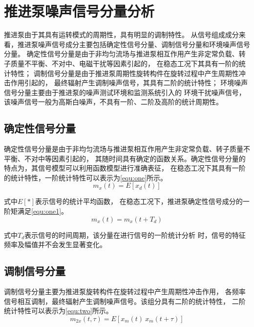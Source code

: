 \section{推进泵噪声信号分量分析}
推进泵由于其具有运转模式的周期性，具有明显的调制特性。
从信号组成成分来看，推进泵噪声信号成分主要包括确定性信号分量、调制信号分量和环境噪声信号分量。
确定性信号分量是由于非均匀流场与推进泵相互作用产生非定常负载、转子质量不平衡、不对中、电磁干扰等因素引起的，
在稳态工况下其具有一阶的统计特性；
调制信号分量是由于推进泵周期性旋转构件在旋转过程中产生周期性冲击作用引起的，
最终辐射产生调制噪声信号，其具有二阶的统计特性；
环境噪声信号分量主要由于推进泵的噪声测试环境和监测系统引入的
环境干扰噪声信号，该噪声信号一般为高斯白噪声，不具有一阶、二阶及高阶的统计周期性\cite{antoniCyclostationaryModellingRotating2004a,song2019}。
\begin{comment}
推进泵噪声信号模型可以利用\autoref{fig:signal_modle}进行表示。
\begin{figure}[htbp]
    \centering
    \texttt{[image: 5推进泵信号模型.png]}
    \caption{\label{fig:signal_modle}推进泵噪声信号模型}
\end{figure}
\end{comment}

\subsection{确定性信号分量}
确定性信号分量是由于非均匀流场与推进泵相互作用产生非定常负载、转子质量不平衡、不对中等因素引起的，
其随时间具有确定的函数关系。确定性信号分量的特点为，其信号模型可以利用函数模型进行准确表征，
在稳态工况下其具有一阶的统计特性，一阶统计特性可以表示为\autoref{equ:one}所示。
\begin{equation}
    \label{equ:one}
    m_{x}\left ( t \right ) =E\left [ x_{d}\left ( t   \right )  \right ]
\end{equation}

式中$E[*]$表示信号的统计平均函数，
在稳态工况下，推进泵确定性信号成分的一阶矩满足\autoref{equ:one1}。
\begin{equation}
    \label{equ:one1}
    m_{x}\left ( t \right ) =m_{x}\left ( t+T_d \right )
\end{equation}

式中$T_{d}$表示信号的时间周期，该分量在进行信号的一阶统计分析
时，信号的特征频率及幅值并不会发生显著变化。
\subsection{调制信号分量}
调制信号分量主要为推进泵旋转构件在旋转过程中产生周期性冲击作用，
各频率信号相互调制，最终辐射产生调制噪声信号。该组分具有二阶的统计特性，
二阶统计特性可以表示为\autoref{equ:two}所示。
\begin{equation}
    \label{equ:two}
    m_{2x}\left ( t, \tau \right )  =E\left [ x_{m}\left ( t \right ) \ x_{m}\left ( t+\tau \right )  \right ] 
\end{equation}

